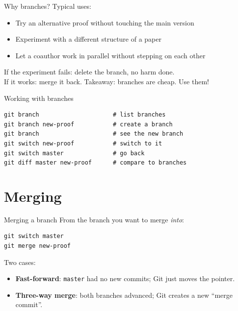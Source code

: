 \documentclass[11pt]{beamer}
\begin{document}
\begin{frame}{Why branches?}
  Typical uses:
  \begin{itemize}
    \item Try an alternative proof without touching the main version
    \item Experiment with a different structure of a paper
    \item Let a coauthor work in parallel without stepping on each other
  \end{itemize}
  \vfill
  If the experiment fails: delete the branch, no harm done.
  \\
  If it works: merge it back.
  \vfill
  Takeaway: branches are cheap.  Use them!
\end{frame}

\begin{frame}[fragile]{Working with branches}
\begin{lstlisting}
git branch                     # list branches
git branch new-proof           # create a branch
git branch                     # see the new branch
git switch new-proof           # switch to it
git switch master              # go back
git diff master new-proof      # compare to branches
\end{lstlisting}
\end{frame}

\section{Merging}

\begin{frame}[fragile]{Merging a branch}
  From the branch you want to merge \emph{into}:
\begin{lstlisting}
git switch master
git merge new-proof
\end{lstlisting}
  \vfill
  Two cases:
  \begin{itemize}
  \item
    \textbf{Fast-forward}: \texttt{master} had no new commits;
    Git just moves the pointer.
  \item
    \textbf{Three-way merge}: both branches advanced;
    Git creates a new ``merge commit''.
  \end{itemize}
\end{frame}
\end{document}
